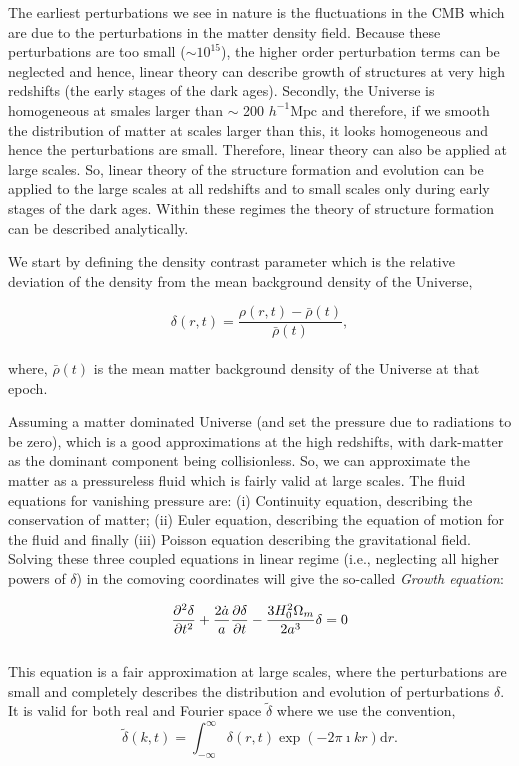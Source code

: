 The earliest perturbations we see in nature is the fluctuations in the
CMB which are due to the perturbations in the matter density
field. Because these perturbations are too small ($\sim 10^{15}$), 
the higher order perturbation
terms can be neglected and hence, linear theory can describe growth of structures
at very high redshifts (the early stages of the dark ages). 
Secondly, the Universe is homogeneous at smales larger than
$\sim$ 200 $h^{-1} \mathrm{Mpc}$ and therefore, if we smooth the distribution
of matter at scales larger than this, it looks homogeneous and hence the perturbations
are small. Therefore, linear theory can also be applied at large scales. 
So, linear theory of the structure formation and evolution can be applied
to the large scales at all redshifts and to small scales only during
early stages of the dark ages. 
Within these regimes the theory of structure formation can be
described analytically.

We start by defining the density contrast parameter which is the relative 
deviation of the density from the mean background density of the Universe,

\begin{equation}
	\delta(r,t) = \dfrac{\rho(r,t) - \bar{\rho}(t)}{\bar{\rho}(t)},
\end{equation}
\\
where, $\bar{\rho}(t)$ is the mean matter background density 
of the Universe at that epoch. 

Assuming a matter dominated Universe (and set the pressure due to radiations
to be zero), which is a good approximations at the
high redshifts, with dark-matter as the dominant component being collisionless. 
So, we can approximate the matter as a pressureless fluid which is fairly 
valid at large scales. The fluid equations for vanishing pressure are: 
(i) Continuity equation, describing the conservation of matter; (ii) Euler
equation, describing the equation of motion for the fluid and finally (iii) 
Poisson equation describing the gravitational field. Solving these three coupled
equations in linear regime (i.e., neglecting all higher powers of $\delta$) in 
the comoving coordinates will give
the so-called {\it Growth equation}:

\begin{equation}
\centering
\dfrac{\partial^2 {\delta}}{\partial t^2} + \dfrac{2\dot{a}}{a} 
		\dfrac{\partial {\delta}}{\partial t}
		- \dfrac{3H_0^2 \Omega_m}{2a^3} {\delta} = 0
		\label{eqn:growth}
\end{equation}
\\
This equation is a fair approximation at large scales, where the perturbations
are small and completely describes the distribution and evolution of perturbations $\delta$. 
It is valid for both real and Fourier space $\tilde{\delta}$ where we use the convention,
\begin{equation}
	\tilde{\delta}(k,t) = \int_{-\infty}^{\infty} \delta(r,t) \exp(-2\pi \imath kr) \mathrm{d}r.
\end{equation}

